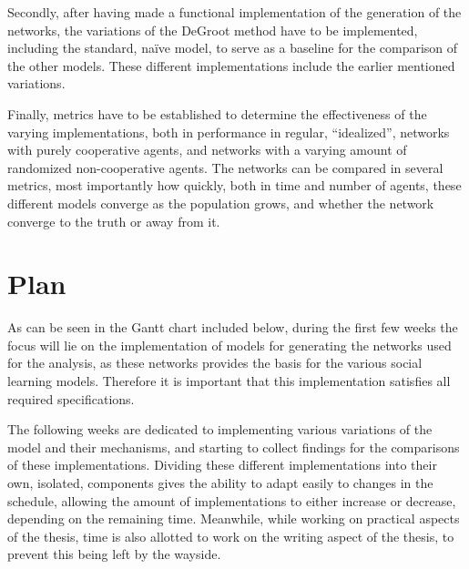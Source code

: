 \documentclass{article}
\begin{document}
Secondly, after having made a functional implementation of the generation of the networks, the variations of the DeGroot method have to be implemented, including the standard, na\"ive model, to serve as a baseline for the comparison of the other models. These different implementations include the earlier mentioned variations.

Finally, metrics have to be established to determine the effectiveness of the varying implementations, both in performance in regular, \enquote{idealized}, networks with purely cooperative agents, and networks with a varying amount of randomized non-cooperative agents. The networks can be compared in several metrics, most importantly how quickly, both in time and number of agents, these different models converge as the population grows, and whether the network converge to the truth or away from it.

\newpage
\section*{Plan}
As can be seen in the Gantt chart included below, during the first few weeks the focus will lie on the implementation of models for generating the networks used for the analysis, as these networks provides the basis for the various social learning models. Therefore it is important that this implementation satisfies all required specifications. 

The following weeks are dedicated to implementing various variations of the model and their mechanisms, and starting to collect findings for the comparisons of these implementations. Dividing these different implementations into their own, isolated, components gives the ability to adapt easily to changes in the schedule, allowing the amount of implementations to either increase or decrease, depending on the remaining time. Meanwhile, while working on practical aspects of the thesis, time is also allotted to work on the writing aspect of the thesis, to prevent this being left by the wayside. 
\end{document}
